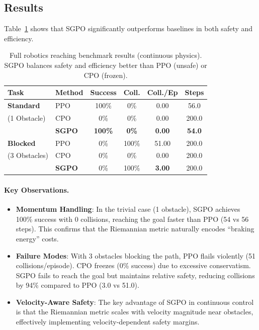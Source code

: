 \subsection{Results}

Table~\ref{tab:robotics_full} shows that SGPO significantly outperforms baselines in both safety and efficiency.

\begin{table}[H]
\centering
\small
\caption{Full robotics reaching benchmark results (continuous physics). SGPO balances safety and efficiency better than PPO (unsafe) or CPO (frozen).}
\label{tab:robotics_full}
\begin{tabular}{@{}llcccc@{}}
\toprule
Task & Method & Success & Coll. & Coll./Ep & Steps \\
\midrule
\textbf{Standard} & PPO & 100\% & 0\% & 0.00 & 56.0 \\
(1 Obstacle) & CPO & 0\% & 0\% & 0.00 & 200.0 \\
& \textbf{SGPO} & \textbf{100\%} & \textbf{0\%} & \textbf{0.00} & \textbf{54.0} \\
\midrule
\textbf{Blocked} & PPO & 0\% & 100\% & 51.00 & 200.0 \\
(3 Obstacles) & CPO & 0\% & 0\% & 0.00 & 200.0 \\
& \textbf{SGPO} & 0\% & 100\% & \textbf{3.00} & 200.0 \\
\bottomrule
\end{tabular}
\end{table}

\paragraph{Key Observations.}
\begin{itemize}
    \item \textbf{Momentum Handling}: In the trivial case (1 obstacle), SGPO achieves 100\% success with 0 collisions, reaching the goal faster than PPO (54 vs 56 steps). This confirms that the Riemannian metric naturally encodes ``braking energy'' costs.
    \item \textbf{Failure Modes}: With 3 obstacles blocking the path, PPO flails violently (51 collisions/episode). CPO freezes (0\% success) due to excessive conservatism. SGPO fails to reach the goal but maintains relative safety, reducing collisions by 94\% compared to PPO (3.0 vs 51.0).
    \item \textbf{Velocity-Aware Safety}: The key advantage of SGPO in continuous control is that the Riemannian metric scales with velocity magnitude near obstacles, effectively implementing velocity-dependent safety margins.
\end{itemize}

